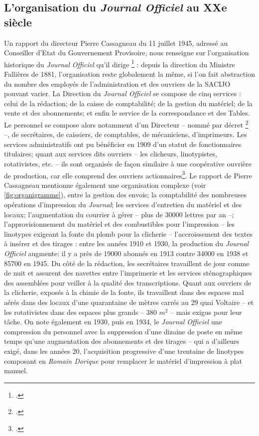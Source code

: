 \subsection{L'organisation du \emph{Journal Officiel} au XXe siècle}

Un rapport du directeur Pierre Cassagneau du 11 juillet 1945, adressé au Conseiller d'Etat du Gouvernement Provisoire, nous renseigne sur l'organisation historique du \emph{Journal Officiel} qu'il dirige \footcite[][]{cote6} : depuis la direction du Ministre Fallières de 1881, l'organisation reste globalement la même, si l'on fait abstraction du nombre des employés de l'administration et des ouvriers de la SACIJO pouvant varier. La Direction du \emph{Journal Officiel} se compose de cinq services : celui de la rédaction; de la caisse de comptabilité; de la gestion du matériel; de la vente et des abonnements; et enfin le service de la correspondance et des Tables. Le personnel se compose alors notamment d'un Directeur -- nommé par décret \footcite[][]{cote1} --, de secrétaires, de caissiers, de comptables, de mécaniciens, d'imprimeurs. Les services administratifs ont pu bénéficier en 1909 d'un statut de fonctionnaires titulaires; quant aux services dits ouvriers -- les clicheurs, linotypistes, rotativistes, etc. -- ils sont organisés de façon similaire à une coopérative ouvrière de production, car elle comprend des ouvriers actionnaires\footcite[][]{cote6}. Le rapport de Pierre Cassagneau mentionne également une organisation complexe (voir \ref{fig:organigramme}), entre la gestion des envois; la comptabilité des nombreuses opérations d'impression du \emph{Journal}; les services d'entretien du matériel et des locaux; l'augmentation du courrier à gérer --  plus de 30000 lettres par an --; l'approvisionnement du matériel et des combustibles pour l'impression -- les linotypes exigeant la fonte du plomb pour la clicherie -- l'accroissement des textes à insérer et des tirages : entre les années 1910 et 1930, la production du \emph{Journal Officiel} augmente: il y a près de 19000 abonnés en 1913 contre 34000 en 1938 et 85700 en 1945. Du côté de la rédaction, les secrétaires travaillent de jour comme de nuit et assurent des navettes entre l'imprimerie et les services sténographiques des assemblées pour veiller à la qualité des transcriptions. Quant aux ouvriers de la clicherie, exposés à la chimie de la fonte, ils travaillent dans des espaces mal aérés dans des locaux d'une quarantaine de mètres carrés au 29 quai Voltaire -- et les rotativistes dans des espaces plus grands -- 380 $m^2$ -- mais exigus pour leur tâche. On note également en 1930, puis en 1934, le \emph{Journal Officiel} une compression du personnel avec la suppression d'une dizaine de poste en même temps qu'une augmentation des abonnements et des tirages -- qui a d'ailleurs exigé, dans les années 20, l'acquisition progressive d'une trentaine de linotypes composant en \emph{Romain Dorique} pour remplacer le matériel d'impression à plat manuel.

